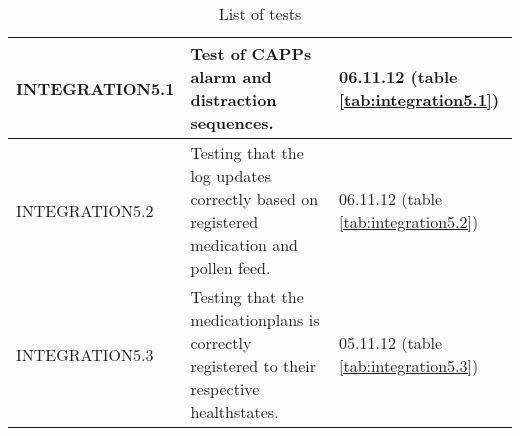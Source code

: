 \begin{table}
\begin{center}
\begin{tabular}{|p{3.3cm}|p{10.0cm}|p{4.0cm}|}
				\hline
				INTEGRATION5.1 & Test of CAPPs alarm and distraction sequences. & 							06.11.12 (table \ref{tab:integration5.1})\\
				\hline
				INTEGRATION5.2 & Testing that the log updates correctly based on registered medication and pollen feed. & 	06.11.12 (table \ref{tab:integration5.2})\\
				\hline
				INTEGRATION5.3 & Testing that the medicationplans is correctly registered to their respective healthstates. & 	05.11.12 (table \ref{tab:integration5.3})\\
			\hline
		\end{tabular}
	\end{center}
	\caption{List of tests}
	\label{tab:listoftests}
\end{table}